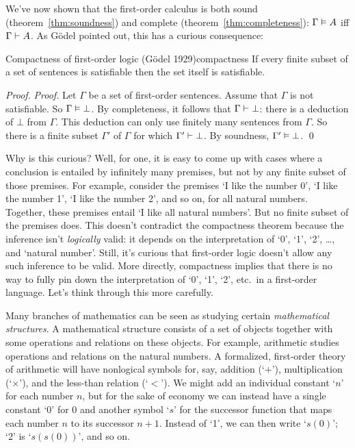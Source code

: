 We've now shown that the first-order calculus is both sound (theorem~\ref{thm:soundness})
and complete (theorem~\ref{thm:completeness}):
$\Gamma \vDash A$ iff $\Gamma \vdash A$.
As Gödel pointed out,
this has a curious consequence:

\begin{theorem}{Compactness of first-order logic (Gödel 1929)}{compactness}
   If every finite subset of a set of sentences is satisfiable then the set itself is satisfiable.
\end{theorem}

\begin{proof}
  \emph{Proof.}
  Let $\Gamma$ be a set of first-order sentences.
  Assume that $\Gamma$ is not satisfiable.
  So $\Gamma \vDash \bot$.
  By completeness,
  it follows that $\Gamma \vdash \bot$:
  there is a deduction of $\bot$ from $\Gamma$.
  This deduction can only use finitely many sentences from $\Gamma$.
  So there is a finite subset $\Gamma'$ of $\Gamma$ for which $\Gamma' \vdash \bot$.
  By soundness,
  $\Gamma' \vDash \bot$.
  \qed
\end{proof}


Why is this curious?
Well, for one,
it is easy to come up with cases where a conclusion is entailed by infinitely many premises,
but not by any finite subset of those premises.
For example,
consider the premises
`I like the number 0',
`I like the number 1',
`I like the number 2',
and so on, for all natural numbers.
Together,
these premises entail `I like all natural numbers'.
But no finite subset of the premises does.
This doesn't contradict the compactness theorem because the inference isn't \emph{logically} valid:
it depends on the interpretation of `0', `1', `2', \ldots, and `natural number'.
Still,
it's curious that first-order logic doesn't allow any such inference to be valid.
More directly,
compactness implies that
there is no way to fully pin down the interpretation of `0', `1', `2', etc.\
in a first-order language.
Let's think through this more carefully.

Many branches of mathematics can be seen as studying certain \emph{mathematical structures}.
A mathematical structure consists of a set of objects together with some operations and relations on these objects.
For example,
arithmetic studies operations and relations on the
natural numbers.
A formalized, first-order theory of arithmetic will have
nonlogical symbols for, say, addition (`$+$'),
multiplication (`$\times$'),
and the less-than relation (`$<$').
We might add an individual constant `$n$' for each number $n$,
but for the sake of economy we can instead have a single constant `0' for 0
and another symbol `$s$' for the successor function
that maps each number $n$ to its successor $n+1$.
Instead of `1', we can then write `$s(0)$';
`2' is `$s(s(0))$', and so on.

